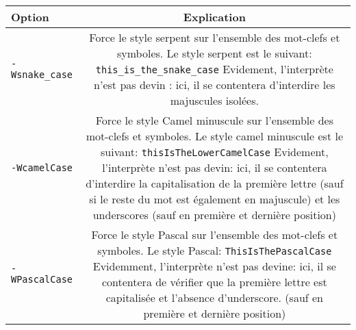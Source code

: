 \documentclass[a5paper, 12pt]{book}
\begin{document}
\begin{tabular}{|l|c|}
  \hline
  Option & Explication\\
  \hline
  \verb!-Wsnake_case! &
  Force le style serpent sur l'ensemble des mot-clefs et symboles. Le style serpent est le suivant:
  \verb!this_is_the_snake_case!
  Evidement, l'interprète n'est pas devin : ici, il se contentera d'interdire les majuscules isolées.
  \\
  \verb!-WcamelCase! &
  Force le style Camel minuscule sur l'ensemble des mot-clefs et symboles. Le style camel minuscule
  est le suivant:
  \verb!thisIsTheLowerCamelCase!
  Evidement, l'interprète n'est pas devin: ici, il se contentera d'interdire la capitalisation
  de la première lettre (sauf si le reste du mot est également en majuscule) et les underscores (sauf
  en première et dernière position)
  \\
  \verb!-WPascalCase! &
  Force le style Pascal sur l'ensemble des mot-clefs et symboles. Le style Pascal:
  \verb!ThisIsThePascalCase!
  Evidemment, l'interprète n'est pas devine: ici, il se contentera de vérifier que la première
  lettre est capitalisée et l'absence d'underscore. (sauf en première et dernière position) \\
  \hline
  \end{tabular}
  
\end{document}
